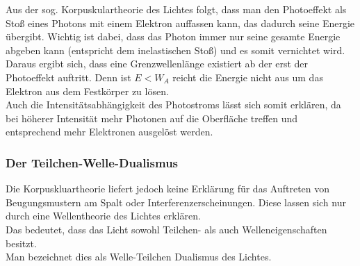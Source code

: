 Aus der sog. Korpuskulartheorie des Lichtes folgt, dass man den Photoeffekt als Stoß eines Photons mit einem Elektron auffassen kann, das dadurch seine Energie übergibt. Wichtig ist dabei, dass das Photon immer nur seine gesamte Energie abgeben kann (entspricht dem inelastischen Stoß) und es somit vernichtet wird.\\
Daraus ergibt sich, dass eine Grenzwellenlänge existiert ab der erst der Photoeffekt auftritt. Denn ist $E < W_A$ reicht die Energie nicht aus um das Elektron aus dem Festkörper zu lösen.\\
Auch die Intensitätsabhängigkeit des Photostroms lässt sich somit erklären, da bei höherer Intensität mehr Photonen auf die Oberfläche treffen und entsprechend mehr Elektronen ausgelöst werden.\\

\subsubsection{Der Teilchen-Welle-Dualismus}
Die Korpuskluartheorie liefert jedoch keine Erklärung für das Auftreten von Beugungsmustern am Spalt oder Interferenzerscheinungen. Diese lassen sich nur durch eine Wellentheorie des Lichtes erklären.\\
Das bedeutet, dass das Licht sowohl Teilchen- als auch Welleneigenschaften besitzt.\\
Man bezeichnet dies als Welle-Teilchen Dualismus des Lichtes.

